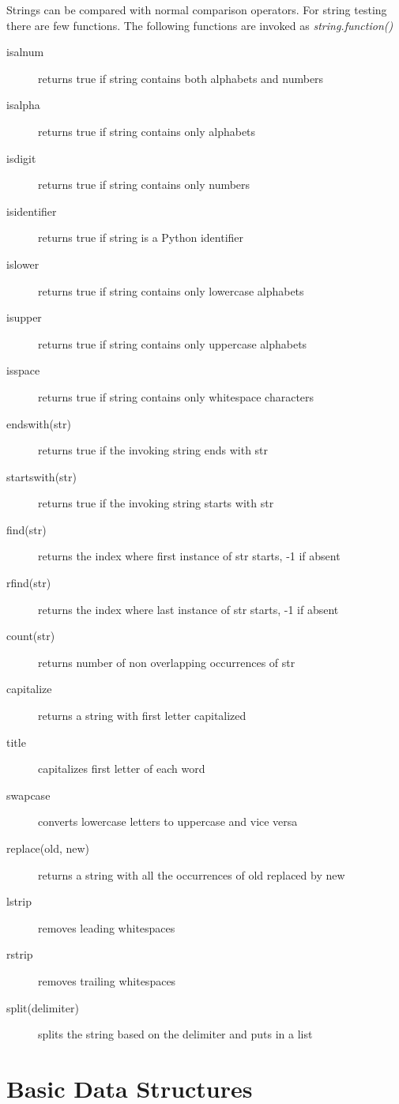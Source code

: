 \documentclass[a4paper, 12pt]{article}
\begin{document}
Strings can be compared with normal comparison operators. For string testing there are few functions. The following functions are invoked as \emph{string.function()}
\begin{description}
\item[isalnum] returns true if string contains both alphabets and numbers
\item[isalpha] returns true if string contains only alphabets
\item[isdigit] returns true if string contains only numbers
\item[isidentifier] returns true if string is a Python identifier
\item[islower] returns true if string contains only lowercase alphabets
\item[isupper] returns true if string contains only uppercase alphabets
\item[isspace] returns true if string contains only whitespace characters
\item[endswith(str)] returns true if the invoking string ends with str
\item[startswith(str)] returns true if the invoking string starts with str
\item[find(str)] returns the index where first instance of str starts, -1 if absent
\item[rfind(str)] returns the index where last instance of str starts, -1 if absent
\item[count(str)] returns number of non overlapping occurrences of str
\item[capitalize] returns a string with first letter capitalized
\item[title] capitalizes first letter of each word
\item[swapcase] converts lowercase letters to uppercase and vice versa
\item[replace(old, new)] returns a string with all the occurrences of old replaced by new
\item[lstrip] removes leading whitespaces
\item[rstrip] removes trailing whitespaces
\item[split(delimiter)] splits the string based on the delimiter and puts in a list
\end{description}

\section{Basic Data Structures}
\end{document}
